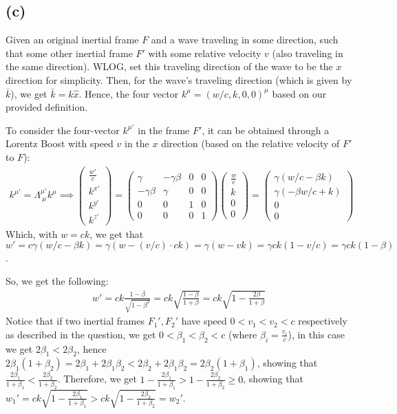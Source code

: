 \documentclass{article}
\begin{document}
\subsection*{(c)}
Given an original inertial frame $F$ and a wave traveling in some direction, such that some other inertial frame $F'$ with some relative velocity $v$ (also traveling in the same direction). WLOG, set this traveling direction of the wave to be the $x$ direction for simplicity. Then, for the wave's traveling direction (which is given by $\bar{k}$), we get $\bar{k} = k\hat{x}$. Hence, the four vector $k^\mu = (w/c, k, 0,0)^\mu$ based on our provided definition. 

To consider the four-vector $k^{\mu'}$ in the frame $F'$, it can be obtained through a Lorentz Boost with speed $v$ in the $x$ direction (based on the relative velocity of $F'$ to $F$):
\begin{align}
    k^{\mu'} = \Lambda^{\mu'}_{\ \mu}k^\mu \implies \begin{pmatrix}
        \frac{w'}{c}\\k^{x'}\\k^{y'}\\k^{z'}
    \end{pmatrix}=\begin{pmatrix}
        \gamma & -\gamma\beta&0&0\\
        -\gamma\beta&\gamma&0&0\\
        0&0&1&0\\0&0&0&1
    \end{pmatrix}\begin{pmatrix}
        \frac{w}{c}\\k\\0\\0
    \end{pmatrix} = \begin{pmatrix}
        \gamma(w/c - \beta k)\\ \gamma(-\beta w/c+k)\\0\\0
    \end{pmatrix}
\end{align}
Which, with $w=ck$, we get that $w' = c\gamma(w/c-\beta k) = \gamma(w-(v/c)\cdot ck) = \gamma(w-vk) = \gamma ck(1-v/c) = \gamma ck(1-\beta)$.

So, we get the following:
\begin{align}
    w' = ck\frac{1-\beta}{\sqrt{1-\beta^2}} = ck\sqrt{\frac{1-\beta}{1+\beta}} = ck\sqrt{1-\frac{2\beta}{1+\beta}}
\end{align}
Notice that if two inertial frames $F_1', F_2'$ have speed $0<v_1<v_2<c$ respectively as described in the question, we get $0<\beta_1<\beta_2<c$ (where $\beta_i = \frac{v_i}{c}$), in this case we get $2\beta_1 < 2\beta_2$, hence $2\beta_1 (1+\beta_2) = 2\beta_1 + 2\beta_1\beta_2 < 2\beta_2 + 2\beta_1\beta_2 = 2\beta_2(1+\beta_1)$, showing that $\frac{2\beta_1}{1+\beta_1}<\frac{2\beta_2}{1+\beta_2}$. Therefore, we get $1-\frac{2\beta_1}{1+\beta_1}>1-\frac{2\beta_2}{1+\beta_2}\geq 0$, showing that $w_1'=ck\sqrt{1-\frac{2\beta_1}{1+\beta_1}}>ck\sqrt{1-\frac{2\beta_2}{1+\beta_2}}=w_2'$.
\end{document}

